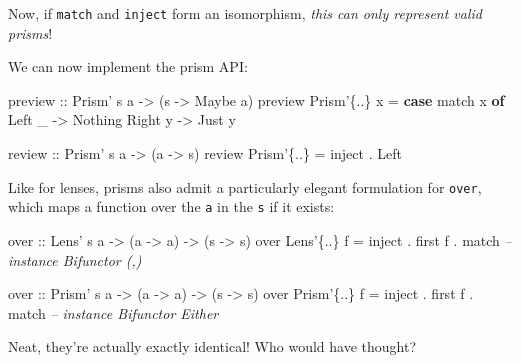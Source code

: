 \documentclass[]{article}
\newenvironment{Shaded}{}{}
\newcommand{\CommentTok}[1]{\textcolor[rgb]{0.38,0.63,0.69}{\textit{#1}}}
\newcommand{\DataTypeTok}[1]{\textcolor[rgb]{0.56,0.13,0.00}{#1}}
\newcommand{\FunctionTok}[1]{\textcolor[rgb]{0.02,0.16,0.49}{#1}}
\newcommand{\KeywordTok}[1]{\textcolor[rgb]{0.00,0.44,0.13}{\textbf{#1}}}
\newcommand{\NormalTok}[1]{#1}
\newcommand{\OtherTok}[1]{\textcolor[rgb]{0.00,0.44,0.13}{#1}}
\begin{document}
Now, if \texttt{match} and \texttt{inject} form an isomorphism, \emph{this can
only represent valid prisms}!

We can now implement the prism API:

\begin{Shaded}
\begin{Highlighting}[]
\OtherTok{preview ::} \DataTypeTok{Prism'}\NormalTok{ s a }\OtherTok{->}\NormalTok{ (s }\OtherTok{->} \DataTypeTok{Maybe}\NormalTok{ a)}
\NormalTok{preview }\DataTypeTok{Prism'}\NormalTok{\{}\FunctionTok{..}\NormalTok{\} x }\FunctionTok{=} \KeywordTok{case}\NormalTok{ match x }\KeywordTok{of}
    \DataTypeTok{Left}\NormalTok{ _  }\OtherTok{->} \DataTypeTok{Nothing}
    \DataTypeTok{Right}\NormalTok{ y }\OtherTok{->} \DataTypeTok{Just}\NormalTok{ y}

\OtherTok{review  ::} \DataTypeTok{Prism'}\NormalTok{ s a }\OtherTok{->}\NormalTok{ (a }\OtherTok{->}\NormalTok{ s)}
\NormalTok{review }\DataTypeTok{Prism'}\NormalTok{\{}\FunctionTok{..}\NormalTok{\} }\FunctionTok{=}\NormalTok{ inject }\FunctionTok{.} \DataTypeTok{Left}
\end{Highlighting}
\end{Shaded}

Like for lenses, prisms also admit a particularly elegant formulation for
\texttt{over}, which maps a function over the \texttt{a} in the \texttt{s} if it
exists:

\begin{Shaded}
\begin{Highlighting}[]
\OtherTok{over ::} \DataTypeTok{Lens'}\NormalTok{ s a  }\OtherTok{->}\NormalTok{ (a }\OtherTok{->}\NormalTok{ a) }\OtherTok{->}\NormalTok{ (s }\OtherTok{->}\NormalTok{ s)}
\NormalTok{over }\DataTypeTok{Lens'}\NormalTok{\{}\FunctionTok{..}\NormalTok{\}  f }\FunctionTok{=}\NormalTok{ inject }\FunctionTok{.}\NormalTok{ first f }\FunctionTok{.}\NormalTok{ match    }\CommentTok{-- instance Bifunctor (,)}

\OtherTok{over ::} \DataTypeTok{Prism'}\NormalTok{ s a }\OtherTok{->}\NormalTok{ (a }\OtherTok{->}\NormalTok{ a) }\OtherTok{->}\NormalTok{ (s }\OtherTok{->}\NormalTok{ s)}
\NormalTok{over }\DataTypeTok{Prism'}\NormalTok{\{}\FunctionTok{..}\NormalTok{\} f }\FunctionTok{=}\NormalTok{ inject }\FunctionTok{.}\NormalTok{ first f }\FunctionTok{.}\NormalTok{ match    }\CommentTok{-- instance Bifunctor Either}
\end{Highlighting}
\end{Shaded}

Neat, they're actually exactly identical! Who would have thought?
\end{document}
